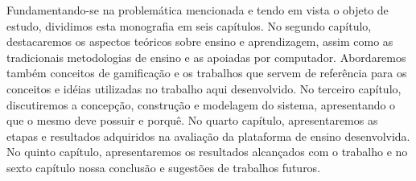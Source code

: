 Fundamentando-se na problemática mencionada e tendo em vista o objeto de estudo, dividimos esta monografia em seis capítulos. 
No segundo cap\'itulo, destacaremos os aspectos teóricos sobre ensino e aprendizagem, assim como as tradicionais metodologias de ensino e as apoiadas por computador. Abordaremos tamb\'em conceitos de gamificação e os trabalhos que servem de refer\^encia para os conceitos e id\'eias utilizadas no trabalho aqui desenvolvido. 
No terceiro capítulo, discutiremos a concepção, construção e modelagem do sistema, apresentando o que o mesmo deve possuir e porquê. No quarto capítulo, apresentaremos as etapas e resultados adquiridos na avaliação da plataforma de ensino desenvolvida. No quinto capítulo, apresentaremos os resultados alcan\c{c}ados com o trabalho e no sexto capítulo nossa conclusão e sugestões de trabalhos futuros. 